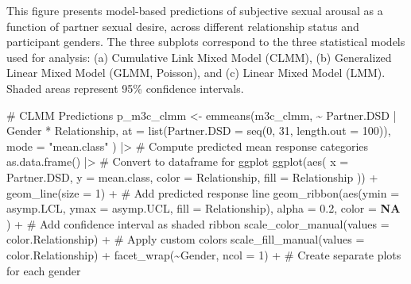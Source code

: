 \documentclass[
  bookmarksnumbered]{article}
\newenvironment{Shaded}{\begin{snugshade}}{\end{snugshade}}
\newcommand{\AttributeTok}[1]{\textcolor[rgb]{0.80,0.80,0.80}{#1}}
\newcommand{\CommentTok}[1]{\textcolor[rgb]{0.50,0.62,0.50}{#1}}
\newcommand{\ConstantTok}[1]{\textcolor[rgb]{0.86,0.64,0.64}{\textbf{#1}}}
\newcommand{\DecValTok}[1]{\textcolor[rgb]{0.86,0.86,0.80}{#1}}
\newcommand{\FloatTok}[1]{\textcolor[rgb]{0.75,0.75,0.82}{#1}}
\newcommand{\FunctionTok}[1]{\textcolor[rgb]{0.94,0.94,0.56}{#1}}
\newcommand{\NormalTok}[1]{\textcolor[rgb]{0.80,0.80,0.80}{#1}}
\newcommand{\OtherTok}[1]{\textcolor[rgb]{0.94,0.94,0.56}{#1}}
\newcommand{\SpecialCharTok}[1]{\textcolor[rgb]{0.86,0.64,0.64}{#1}}
\newcommand{\StringTok}[1]{\textcolor[rgb]{0.80,0.58,0.58}{#1}}
\begin{document}
This figure presents model-based predictions of subjective sexual arousal as a function of partner sexual desire, across different relationship status and participant genders. The three subplots correspond to the three statistical models used for analysis: (a) Cumulative Link Mixed Model (CLMM), (b) Generalized Linear Mixed Model (GLMM, Poisson), and (c) Linear Mixed Model (LMM). Shaded areas represent 95\% confidence intervals.

\begin{Shaded}
\begin{Highlighting}[]
\CommentTok{\# CLMM Predictions}
\NormalTok{p\_m3c\_clmm }\OtherTok{\textless{}{-}} \FunctionTok{emmeans}\NormalTok{(m3c\_clmm, }\SpecialCharTok{\textasciitilde{}}\NormalTok{ Partner.DSD }\SpecialCharTok{|}\NormalTok{ Gender }\SpecialCharTok{*}\NormalTok{ Relationship,}
  \AttributeTok{at =} \FunctionTok{list}\NormalTok{(}\AttributeTok{Partner.DSD =} \FunctionTok{seq}\NormalTok{(}\DecValTok{0}\NormalTok{, }\DecValTok{31}\NormalTok{, }\AttributeTok{length.out =} \DecValTok{100}\NormalTok{)),}
  \AttributeTok{mode =} \StringTok{"mean.class"}
\NormalTok{) }\SpecialCharTok{|\textgreater{}} \CommentTok{\# Compute predicted mean response categories}
  \FunctionTok{as.data.frame}\NormalTok{() }\SpecialCharTok{|\textgreater{}} \CommentTok{\# Convert to dataframe for ggplot}
  \FunctionTok{ggplot}\NormalTok{(}\FunctionTok{aes}\NormalTok{(}
    \AttributeTok{x =}\NormalTok{ Partner.DSD, }\AttributeTok{y =}\NormalTok{ mean.class,}
    \AttributeTok{color =}\NormalTok{ Relationship, }\AttributeTok{fill =}\NormalTok{ Relationship}
\NormalTok{  )) }\SpecialCharTok{+}
  \FunctionTok{geom\_line}\NormalTok{(}\AttributeTok{size =} \DecValTok{1}\NormalTok{) }\SpecialCharTok{+} \CommentTok{\# Add predicted response line}
  \FunctionTok{geom\_ribbon}\NormalTok{(}\FunctionTok{aes}\NormalTok{(}\AttributeTok{ymin =}\NormalTok{ asymp.LCL, }\AttributeTok{ymax =}\NormalTok{ asymp.UCL, }\AttributeTok{fill =}\NormalTok{ Relationship),}
    \AttributeTok{alpha =} \FloatTok{0.2}\NormalTok{, }\AttributeTok{color =} \ConstantTok{NA}
\NormalTok{  ) }\SpecialCharTok{+} \CommentTok{\# Add confidence interval as shaded ribbon}
  \FunctionTok{scale\_color\_manual}\NormalTok{(}\AttributeTok{values =}\NormalTok{ color.Relationship) }\SpecialCharTok{+} \CommentTok{\# Apply custom colors}
  \FunctionTok{scale\_fill\_manual}\NormalTok{(}\AttributeTok{values =}\NormalTok{ color.Relationship) }\SpecialCharTok{+}
  \FunctionTok{facet\_wrap}\NormalTok{(}\SpecialCharTok{\textasciitilde{}}\NormalTok{Gender, }\AttributeTok{ncol =} \DecValTok{1}\NormalTok{) }\SpecialCharTok{+} \CommentTok{\# Create separate plots for each gender}

\end{Highlighting}
\end{Shaded}
\end{document}
